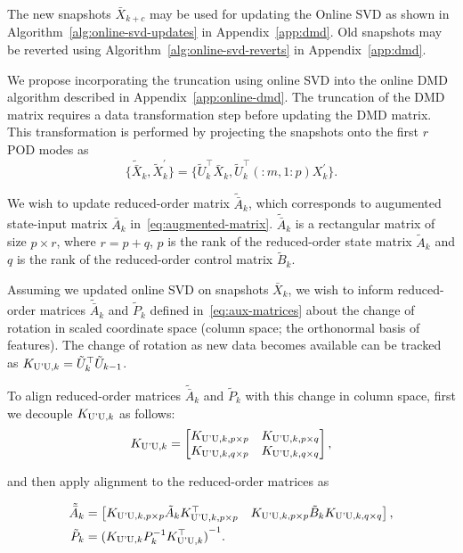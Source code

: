 The new snapshots \(\bar{X}_{k+c}\) may be used for updating the Online SVD as shown in Algorithm~\ref{alg:online-svd-updates} in Appendix~\ref{app:dmd}. Old snapshots may be reverted using Algorithm~\ref{alg:online-svd-reverts} in Appendix~\ref{app:dmd}.

We propose incorporating the truncation using online SVD into the online DMD algorithm described in Appendix~\ref{app:online-dmd}. The truncation of the DMD matrix requires a data transformation step before updating the DMD matrix. This transformation is performed by projecting the snapshots onto the first \(r\) POD modes as
\begin{equation}
    \{\tilde{\bar{X}}_k, \tilde{X}^\prime_k\} = \{\tilde{U}^\top_k\bar{X}_k, \tilde{U}^\top_k(:m, 1:p)X^\prime_k\}.
\end{equation}

We wish to update reduced-order matrix \(\tilde{\bar{A}}_k\), which corresponds to augumented state-input matrix \(\bar{A}_k\) in~\eqref{eq:augmented-matrix}. \(\tilde{\bar{A}}_k\) is a rectangular matrix of size \(p \times r\), where \(r = p + q\), \(p\) is the rank of the reduced-order state matrix \(\tilde{A}_k\) and \(q\) is the rank of the reduced-order control matrix \(\tilde{B}_k\).

Assuming we updated online SVD on snapshots \(\bar{X}_k\), we wish to inform reduced-order matrices \(\tilde{\bar{A}}_k\) and \(\tilde{P}_k\) defined in~\eqref{eq:aux-matrices} about the change of rotation in scaled coordinate space (column space; the orthonormal basis of features). The change of rotation as new data becomes available can be tracked as \(K _{\text{U'U}, k} = \tilde{U}_k^\top \tilde{U}_{k-1}\).

To align reduced-order matrices \(\tilde{\bar{A}}_k\) and \(\tilde{P}_k\) with this change in column space, first we decouple \(K _{\text{U'U}, k}\) as follows:
\begin{equation}
    K _{\text{U'U}, k} = \begin{bmatrix}
        K _{\text{U'U}, k, p \times p} & K _{\text{U'U}, k, p \times q} \\
        K _{\text{U'U}, k, q \times p} & K _{\text{U'U}, k, q \times q}
    \end{bmatrix},
\end{equation}

and then apply alignment to the reduced-order matrices as

\begin{align}
    \tilde{\bar{A}}_k & = \begin{bmatrix} K _{\text{U'U}, k, p \times p} \tilde{A}_k K _{\text{U'U}, k, p \times p}^\top & K _{\text{U'U}, k, p \times p} \tilde{B}_k K _{\text{U'U}, k, q \times q} \end{bmatrix} , \\
    \tilde{P}_k       & = {(K _{\text{U'U}, k} P_k^{-1} K _{\text{U'U}, k}^\top)}^{-1}.
\end{align}


